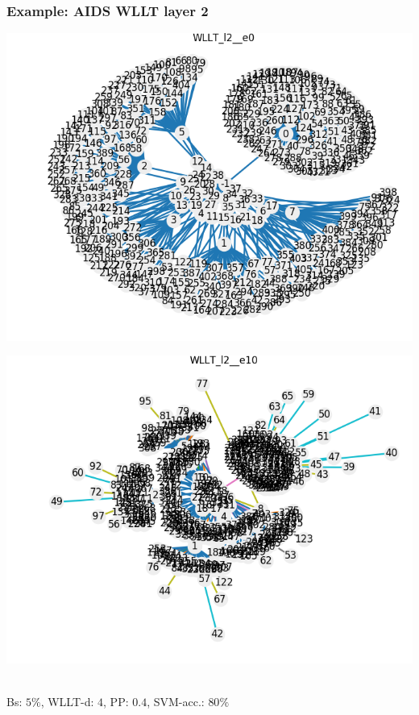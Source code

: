 \begin{frame}\frametitle{Example: AIDS WLLT layer 2}
	\begin{minipage}{0.49\textwidth}
		\includegraphics[width=\textwidth]{images/plot6wllt}
	\end{minipage}
	\begin{minipage}{0.49\textwidth}
		\includegraphics[width=\textwidth]{images/plot7wllt}
	\end{minipage}
	\vspace{2cm} \\
	\tiny{Bs: $5\%$, WLLT-d: $4$, PP: $0.4$, SVM-acc.: $80\%$}
\end{frame}

